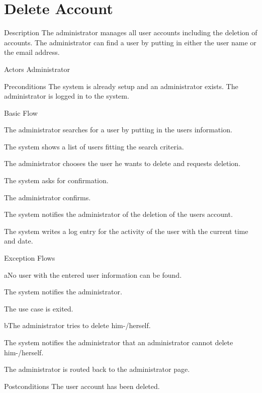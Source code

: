 \section{Delete Account}

%
\begin{cpart}{Description}
The administrator manages all user accounts including the deletion of accounts. The administrator can find a user by putting in either the user name or the email address.
\end{cpart}


%
\begin{cpart}{Actors}
Administrator
\end{cpart}

%
\begin{cpart}{Preconditions}
The system is already setup and an administrator exists. The administrator is logged in to the system.
\end{cpart}

%
\begin{cpartList}{Basic Flow}
  \item The administrator searches for a user by putting in the users information.
  \item The system shows a list of users fitting the search criteria.
  \item The administrator chooses the user he wants to delete and requests deletion.
  \item The system asks for confirmation.
  \item The administrator confirms.
  \item The system notifies the administrator of the deletion of the users account.
\item The system writes a log entry for the activity of the user with the current time and date.
\end{cpartList}

%
\begin{cpartList}{Exception Flows}
  \begin{innerList}{4}{a}{No user with the entered user information can be found.}
    \item The system notifies the administrator.
    \item The use case is exited.
  \end{innerList}

  \begin{innerList}{4}{b}{The administrator tries to delete him-/herself.}
    \item The system notifies the administrator that an administrator cannot delete him-/herself.
    \item The administrator is routed back to the administrator page.
  \end{innerList}
\end{cpartList}

%
\begin{cpart}{Postconditions}
The user account has been deleted.
\end{cpart}

